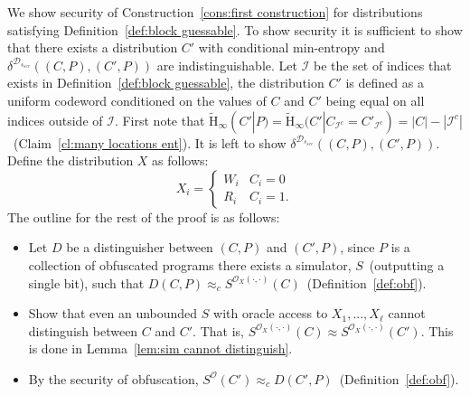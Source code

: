 \documentclass[11pt]{article}
\newcommand{\defref}[1]{\mbox{Definition~\ref{#1}}}
\newcommand{\corref}[1]{\mbox{Corollary~\ref{#1}}}
\newcommand{\lemref}[1]{\mbox{Lemma~\ref{#1}}}
\newcommand{\clref}[1]{\mbox{Claim~\ref{#1}}}
\newcommand{\consref}[1]{\mbox{Construction~\ref{#1}}}
\newcommand{\Hav}{\tilde{\mathrm{H}}_\infty}
\newcommand{\authnote}[2]{{\textcolor{red}{\textsf{#1 notes: }\textcolor{blue}{ #2}}\marginpar{\textcolor{red}{\textbf{!!!!!}}}}}
\newcommand{\authnote}[2]{}
\newcommand{\bnote}[1]{{\authnote{Ben}{#1}}}
\begin{document}
We show security of \consref{cons:first construction} for distributions satisfying \defref{def:block guessable}.
To show security it is sufficient to show that there exists a distribution $C'$ with conditional min-entropy and $\delta^{\mathcal{D}_{s_{sec}}}((C, P), (C', P))$ are indistinguishable.  Let $\mathcal{I}$ be the set of indices that exists in \defref{def:block guessable}, the distribution $C'$ is defined as a uniform codeword conditioned on the values of $C$ and $C'$ being equal on all indices outside of $\mathcal{I}$.  First note that $\Hav(C' |P) =\Hav(C' | C_{\mathcal{I}^c} = C'_{\mathcal{I}^c}) = |C| - |\mathcal{I}^c|$~(\clref{cl:many locations ent}).  It is left to show $\delta^{\mathcal{D}_{s_{sec}}}((C, P), (C', P))$.  
Define the distribution $X$ as follows:
\[X_i = 
\begin{cases}
W_i & C_i = 0\\
R_i & C_i = 1.
\end{cases}\]
The outline for the rest of the proof is as follows:
\begin{itemize}
\item Let $D$ be a distinguisher between $(C, P)$ and $(C', P)$, since $P$ is a collection of obfuscated programs there exists a simulator, $S$~(outputting a single bit), such that $D(C, P) \approx_c S^{\mathcal{O}_X(\cdot, \cdot)}(C)$~(\defref{def:obf}).
\item Show that even an unbounded $S$ with oracle access to $X_1,..., X_\ell$ cannot distinguish between $C$ and $C'$.  That is, $S^{\mathcal{O}_X(\cdot, \cdot)}(C) \approx S^{\mathcal{O}_X(\cdot, \cdot)}(C')$.
This is done in \lemref{lem:sim cannot distinguish}.
\item By the security of obfuscation, $S^{\mathcal{O}}(C') \approx_c D(C', P)$~(\defref{def:obf}).
\end{itemize}
\end{document}
